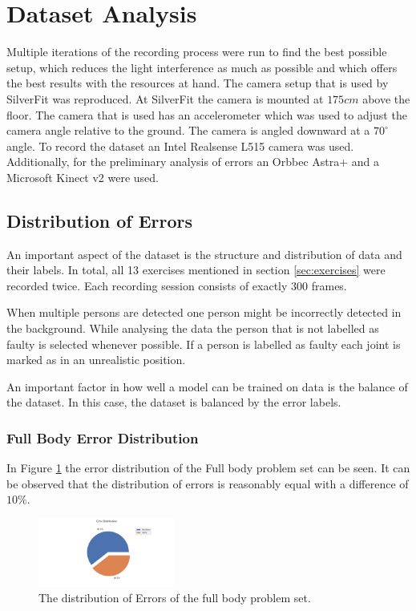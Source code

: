 \section{Dataset Analysis}
\label{sec:dataset}

Multiple iterations of the recording process were run to find the best possible setup, which reduces the light interference as much as possible and which offers the best results with the resources at hand. The camera setup that is used by SilverFit was reproduced. At SilverFit the camera is mounted at $175cm$ above the floor. The camera that is used has an accelerometer which was used to adjust the camera angle relative to the ground. The camera is angled downward at a $70^\circ$ angle. To record the dataset an Intel Realsense L515 camera was used. Additionally, for the preliminary analysis of errors an Orbbec Astra+ and a Microsoft Kinect v2 were used.

\subsection{Distribution of Errors}

An important aspect of the dataset is the structure and distribution of data and their labels. In total, all 13 exercises mentioned in section \ref{sec:exercises} were recorded twice. Each recording session consists of exactly 300 frames.

When multiple persons are detected one person might be incorrectly detected in the background. While analysing the data the person that is not labelled as faulty is selected whenever possible. If a person is labelled as faulty each joint is marked as in an unrealistic position.

An important factor in how well a model can be trained on data is the balance of the dataset. In this case, the dataset is balanced by the error labels. 

\subsubsection{Full Body Error Distribution}

In Figure \ref{fig:fb_pie} the error distribution of the Full body problem set can be seen. It can be observed that the distribution of errors is reasonably equal with a difference of $10\%$. 

\begin{figure}[ht]
  \centering
  \includegraphics[width=0.4\textwidth]{figures/Data/dist_full_body/Error_Distribution_by_Body_Half.png}
  \caption[Error Distribution of the Full Body]{The distribution of Errors of the full body problem set.}
  \label{fig:fb_pie}
\end{figure}

